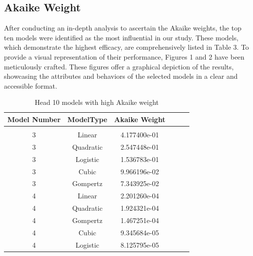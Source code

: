 \documentclass[11pt]{article}
\begin{document}
\subsection{Akaike Weight}
After conducting an in-depth analysis to ascertain the Akaike weights, the top ten models were identified as the most influential in our study. These models, which demonstrate the highest efficacy, are comprehensively listed in Table 3. To provide a visual representation of their performance, Figures 1 and 2 have been meticulously crafted. These figures offer a graphical depiction of the results, showcasing the attributes and behaviors of the selected models in a clear and accessible format.
\begin{table}[ht]
     \centering
     \begin{tabular}{cccccc}
         Model Number & ModelType & Akaike Weight  \\
         \hline
         & & & & \\
          3 & Linear & 4.177400e-01   \\
          3 & Quadratic & 2.547448e-01   \\
          3 & Logistic & 1.536783e-01  \\
          3 & Cubic & 9.966196e-02 \\
          3 & Gompertz & 7.343925e-02 \\
          4 & Linear & 2.201260e-04  \\
          4 & Quadratic & 1.924321e-04   \\
          4 & Gompertz & 1.467251e-04 \\
          4 & Cubic & 9.345684e-05 \\
          4 & Logistic & 8.125795e-05  \\
          \hline
     \end{tabular}
     \caption{Head 10 models with high Akaike weight}
     \label{tab:my_label}
 \end{table}
\end{document}

